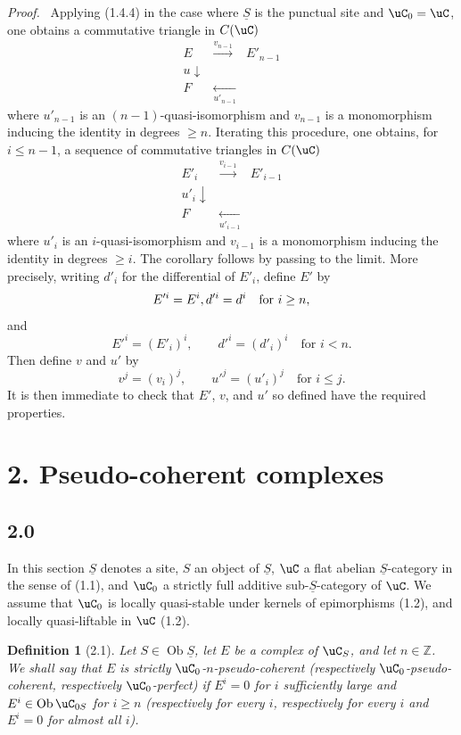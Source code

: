 \documentclass[11pt]{article}
\theoremstyle{plain}
\newtheorem*{definition*}{Definition}
\theoremstyle{definition}
\theoremstyle{remark}
\newenvironment{prooftext}{\par\noindent\textit{Proof.}\ }{\par\medskip}
\newcommand{\ZZ}{\mathbb Z}
\DeclareMathOperator{\ob}{Ob}
\providecommand{\uS}{\underline{S}}
\begin{document}
\begin{prooftext}
Applying (1.4.4) in the case where $\uS$ is the punctual site and $\uC_0=\uC$, one obtains a commutative triangle in $C(\uC)$
\[
\begin{array}{ccc}
E & \xrightarrow{v_{n-1}} & E'_{n-1}\\
u\downarrow && \\
F & \underset{u'_{n-1}}{\longleftarrow} &
\end{array}
\]
where $u'_{n-1}$ is an $(n-1)$-quasi-isomorphism and $v_{n-1}$ is a monomorphism inducing the identity in degrees $\geq n$. Iterating this procedure, one obtains, for $i\leq n-1$, a sequence of commutative triangles in $C(\uC)$
\[
\begin{array}{ccc}
E'_i & \xrightarrow{v_{i-1}} & E'_{i-1}\\
u'_i\downarrow && \\
F & \underset{u'_{i-1}}{\longleftarrow} &
\end{array}
\]
where $u'_i$ is an $i$-quasi-isomorphism and $v_{i-1}$ is a monomorphism inducing the identity in degrees $\geq i$. The corollary follows by passing to the limit. More precisely, writing $d'_i$ for the differential of $E'_i$, define $E'$ by
\[
E'^i=E^i,\\ d'^i=d^i\quad\text{for }i\geq n,
\]
and
\[
E'^i=(E'_i)^i,\qquad d'^i=(d'_i)^i\quad\text{for }i<n.
\]
Then define $v$ and $u'$ by
\[
v^j=(v_i)^j,
\qquad
u'^j=(u'_i)^j
\quad\text{for }i\leq j.
\]
It is then immediate to check that $E'$, $v$, and $u'$ so defined have the required properties.
\end{prooftext}

\section*{2. Pseudo-coherent complexes}

\subsection*{2.0}
In this section $\uS$ denotes a site, $S$ an object of $\uS$, $\uC$ a flat abelian $\uS$-category in the sense of (1.1), and $\uC_0$ a strictly full additive sub-$\uS$-category of $\uC$. We assume that $\uC_0$ is locally quasi-stable under kernels of epimorphisms (1.2), and locally quasi-liftable in $\uC$ (1.2).

\begin{definition*}[2.1]
Let $S\in\ob\uS$, let $E$ be a complex of $\uC_S$, and let $n\in\ZZ$. We shall say that $E$ is \emph{strictly $\uC_0$-$n$-pseudo-coherent} (respectively $\uC_0$-pseudo-coherent, respectively $\uC_0$-perfect) if $E^i=0$ for $i$ sufficiently large and $E^i\in\ob\uC_{0S}$ for $i\geq n$ (respectively for every $i$, respectively for every $i$ and $E^i=0$ for almost all $i$).
\end{definition*}
\end{document}
